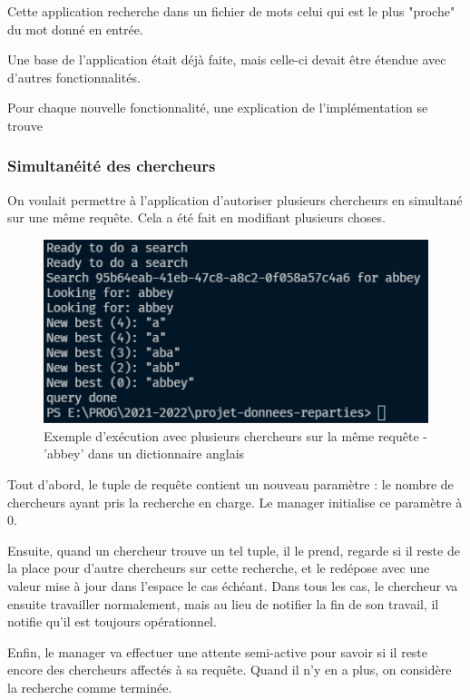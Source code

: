 \documentclass[headings=standardclasses,parskip=half]{scrartcl}
\begin{document}
Cette application recherche dans un fichier de mots celui qui est le plus "proche" du mot donné en entrée.

Une base de l'application était déjà faite, mais celle-ci devait être étendue avec d'autres fonctionnalités.

Pour chaque nouvelle fonctionnalité, une explication de l'implémentation se trouve

\subsubsection{Simultanéité des chercheurs}

On voulait permettre à l'application d'autoriser plusieurs chercheurs en simultané sur une même requête.
Cela a été fait en modifiant plusieurs choses.

\begin{figure}[h]
    \centering
    \includegraphics[scale=0.5]{plusieurs-chercheurs.png}
    \caption{Exemple d'exécution avec plusieurs chercheurs sur la même requête
        - 'abbey' dans un dictionnaire anglais}
\end{figure}

Tout d'abord, le tuple de requête contient un nouveau paramètre : le nombre de chercheurs ayant pris la recherche en charge.
Le manager initialise ce paramètre à 0.

Ensuite, quand un chercheur trouve un tel tuple, il le prend, regarde si il reste de la place pour d'autre chercheurs sur cette recherche,
et le redépose avec une valeur mise à jour dans l'espace le cas échéant.
Dans tous les cas, le chercheur va ensuite travailler normalement, mais au lieu de notifier la fin de son travail, il notifie qu'il
est toujours opérationnel.

Enfin, le manager va effectuer une attente semi-active pour savoir si il reste encore des chercheurs affectés à sa requête.
Quand il n'y en a plus, on considère la recherche comme terminée.
\end{document}
